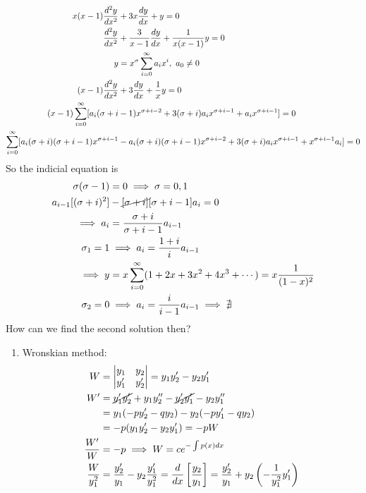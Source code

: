 \documentclass[Maths.tex]{subfiles}
\begin{document}
\begin{example}
\begin{align}
    x(x-1)\frac{d^2 y}{dx^2} &+ 3x\frac{dy}{dx} + y = 0 \\
    \frac{d^2 y}{dx^2} &+ \frac{3}{x-1}\frac{dy}{dx} + \frac{1}{x(x-1)}y = 0 \\
    y &= x^\sigma \sum_{i=0}^\infty a_ix^i, ~ a_0 \neq 0 \\
    (x-1)\frac{d^2 y}{dx^2} &+ 3\frac{dy}{dx} + \frac{1}{x}y = 0 \\
    (x-1)\sum_{i=0}^\infty [a_i(\sigma + i &- 1)x^{\sigma + i -2} + 3(\sigma + i)a_ix^{\sigma + i - 1} + a_ix^{\sigma+i - 1}] = 0 \\
    \sum_{i=0}^\infty [a_i(\sigma+i)(\sigma+i-1)x^{\sigma+i-1} &- a_i(\sigma+i)(\sigma+i-1)x^{\sigma+i-2} + 3(\sigma+i)a_ix^{\sigma+i-1} + x^{\sigma+i-1}a_i] = 0
\end{align}
So the indicial equation is
\begin{align}
    \sigma(\sigma - 1) &= 0 \implies \sigma = 0,1 \\
    a_{i-1}[(\sigma+i)^2] &- \cancel{[\sigma+i]}[\sigma+i-1]a_i = 0 \\
    \implies a_i &= \frac{\sigma+i}{\sigma+i-1}a_{i-1} \\
    \sigma_1 = 1 &\implies a_i = \frac{1+i}{i}a_{i-1} \\
    \implies y &= x\sum_{i=0}^\infty (1 + 2x + 3x^2 + 4x^3 + \cdots) = x\frac{1}{(1-x)^2} \\
    \sigma_2 = 0 &\implies a_i = \frac{i}{i-1}a_{i-1} \implies \nexists
\end{align}
How can we find the second solution then?
\begin{enumerate}
    \item Wronskian method:
    \begin{align}
        W &= \begin{vmatrix} y_1 & y_2 \\ y'_1 & y'_2 \end{vmatrix} = y_1y'_2 - y_2y'_1 \\
        W' &= \cancel{y'_1y'_2} + y_1y''_2 - \cancel{y'_2y'_1} - y_2y''_1 \\
        &= y_1(-py'_2 - qy_2) - y_2(-py'_1 - qy_2) \\
        &= -p(y_1y'_2 - y_2y'_1) = -pW \\
        \frac{W'}{W} &= -p \implies W = ce^{-\int p(x)dx} \\
        \frac{W}{y_1^2} &= \frac{y'_2}{y_1} - y_2\frac{y'_1}{y_1^2} = \frac{d}{dx}\left[\frac{y_2}{y_1}\right] = \frac{y'_2}{y_1} + y_2\left(-\frac{1}{y_1^2}y'_1\right) \\

\end{align}
\end{enumerate}
\end{example}
\end{document}

